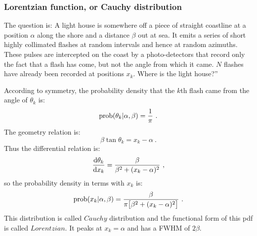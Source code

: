 \documentclass[11pt, a4paper]{article}
\begin{document}
\subsubsection{Lorentzian function, or Cauchy distribution}
\quad

The question is: A light house is somewhere off a piece of straight coastline at a position $\alpha$ along the shore and a distance $\beta$ out at sea. It emits a series of short highly collimated flashes at random intervals and hence at random azimuths. These pulses are intercepted on the coast by a photo-detectors that record only the fact that a flash has come, but not the angle from which it came. $N$ flashes have already been recorded at positions ${x_k}$. Where is the light house?''

According to symmetry, the probability density that the $k$th flash came from the angle of $\theta_k$ is:
\begin{equation}
{\rm prob}(\theta_k|\alpha,\beta)=\frac{1}{\pi}~.
\end{equation}
The geometry relation is:
\begin{equation}
\beta \tan \theta_k = x_k-\alpha~.
\end{equation}
Thus the differential relation is:
\begin{equation}
\frac{{\rm d} \theta_k}{{\rm d} x_k}=\frac{\beta}{\beta^2+(x_k-\alpha)^2}~,
\end{equation}
so the probability density in terms with $x_k$ is:
\begin{equation}
{\rm prob}(x_k|\alpha,\beta)=\frac{\beta}{\pi \big[\beta^2+(x_k-\alpha)^2 \big ]}~.
\end{equation}
This distribution is called $Cauchy$ distribution and the functional form of this pdf is called $Lorentzian$. It peaks at $x_k=\alpha$ and has a FWHM of $2\beta$.
\end{document}
